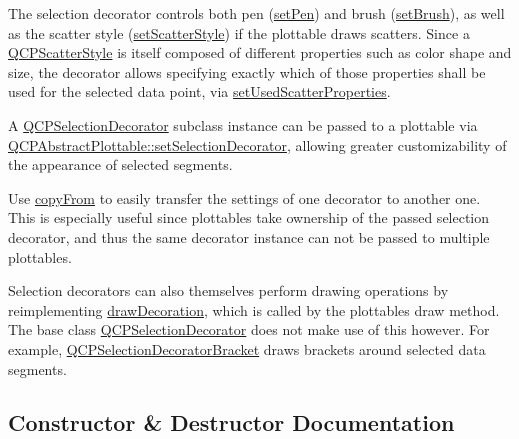 The selection decorator controls both pen (\hyperlink{classQCPSelectionDecorator_ac2c8192e1e294aa3a4a7f32a859e3d76}{set\+Pen}) and brush (\hyperlink{classQCPSelectionDecorator_aa74b626be518ea17055f918d423c8c2d}{set\+Brush}), as well as the scatter style (\hyperlink{classQCPSelectionDecorator_ab403a613289714ff4fd4a0c0371ab116}{set\+Scatter\+Style}) if the plottable draws scatters. Since a \hyperlink{classQCPScatterStyle}{Q\+C\+P\+Scatter\+Style} is itself composed of different properties such as color shape and size, the decorator allows specifying exactly which of those properties shall be used for the selected data point, via \hyperlink{classQCPSelectionDecorator_a808c1607cd4e83869c04986e332455c0}{set\+Used\+Scatter\+Properties}.

A \hyperlink{classQCPSelectionDecorator}{Q\+C\+P\+Selection\+Decorator} subclass instance can be passed to a plottable via \hyperlink{classQCPAbstractPlottable_a20e266ad646f8c4a7e4631040510e5d9}{Q\+C\+P\+Abstract\+Plottable\+::set\+Selection\+Decorator}, allowing greater customizability of the appearance of selected segments.

Use \hyperlink{classQCPSelectionDecorator_a467a8d5cfcab27e862a17c797ac27b8a}{copy\+From} to easily transfer the settings of one decorator to another one. This is especially useful since plottables take ownership of the passed selection decorator, and thus the same decorator instance can not be passed to multiple plottables.

Selection decorators can also themselves perform drawing operations by reimplementing \hyperlink{classQCPSelectionDecorator_a4f8eb49e277063845391e803ae23054a}{draw\+Decoration}, which is called by the plottable\textquotesingle{}s draw method. The base class \hyperlink{classQCPSelectionDecorator}{Q\+C\+P\+Selection\+Decorator} does not make use of this however. For example, \hyperlink{classQCPSelectionDecoratorBracket}{Q\+C\+P\+Selection\+Decorator\+Bracket} draws brackets around selected data segments. 

\subsection{Constructor \& Destructor Documentation}
\mbox{\label{classQCPSelectionDecorator_aa145480d9a062cd176fe30900bb7bca8}} 
